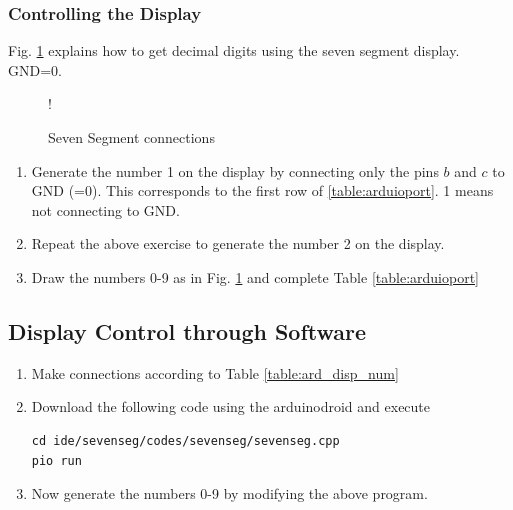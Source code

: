 \subsubsection{Controlling the Display}
%
Fig. \ref{fig:sevenseg12} explains how to get decimal digits using the seven segment display. GND=0.  
\begin{figure}[H]
\begin{center}
 {!} {

}
\end{center}
\caption{Seven Segment connections}
\label{fig:sevenseg12}
\end{figure}
\begin{enumerate}[label=\arabic*.,ref=\theenumi]
\item	Generate the number 1 on the display by connecting only the pins $b$ and $c$ to GND (=0). This corresponds to the  first row of \ref{table:arduioport}. 1 means not connecting to GND.
\item
	Repeat the above exercise to generate the number 2 on the display.
%
\item
Draw the numbers 0-9 as in Fig. \ref{fig:sevenseg12} and complete Table \ref{table:arduioport}
%	
\begin{table}[H]
\centering

\caption{}
\label{table:arduioport}
\end{table}
%
%
\end{enumerate}
\subsection{Display Control through Software}
\begin{enumerate}[label=\arabic*.,ref=\theenumi]
\item
Make connections according to Table \ref{table:ard_disp_num}
\begin{table}
\centering

\caption{}
\label{table:ard_disp_num}
\end{table}

\item
Download the following code using the arduinodroid and execute
%
\begin{lstlisting}
cd ide/sevenseg/codes/sevenseg/sevenseg.cpp
pio run
\end{lstlisting}
%
\item
Now generate the numbers 0-9 by modifying the above program.

\end{enumerate}
